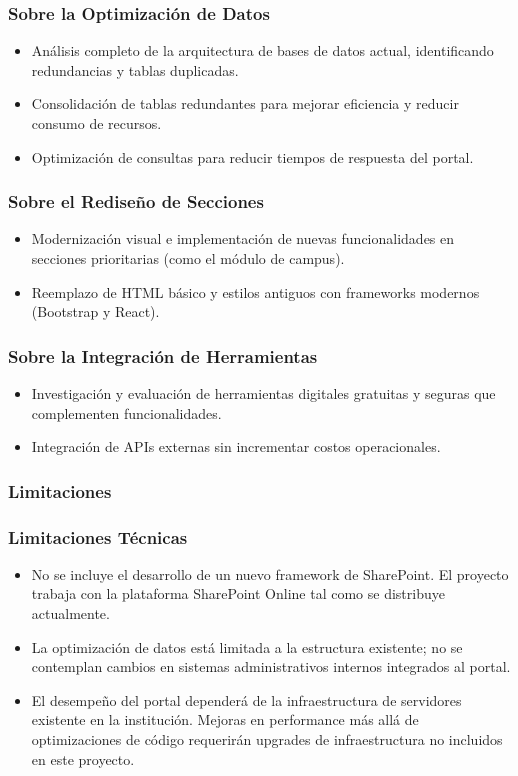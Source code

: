 \subsubsection*{Sobre la Optimización de Datos}
\begin{itemize}
    \item Análisis completo de la arquitectura de bases de datos actual, identificando redundancias y tablas duplicadas.
    \item Consolidación de tablas redundantes para mejorar eficiencia y reducir consumo de recursos.
    \item Optimización de consultas para reducir tiempos de respuesta del portal.
\end{itemize}

\subsubsection*{Sobre el Rediseño de Secciones}
\begin{itemize}
    \item Modernización visual e implementación de nuevas funcionalidades en secciones prioritarias (como el módulo de campus).
    \item Reemplazo de HTML básico y estilos antiguos con frameworks modernos (Bootstrap y React).
\end{itemize}

\subsubsection*{Sobre la Integración de Herramientas}
\begin{itemize}
    \item Investigación y evaluación de herramientas digitales gratuitas y seguras que complementen funcionalidades.
    \item Integración de APIs externas sin incrementar costos operacionales.
\end{itemize}

\subsubsection{Limitaciones}
\label{subsec:limitaciones}

\subsubsection*{Limitaciones Técnicas}
\begin{itemize}
    \item No se incluye el desarrollo de un nuevo framework de SharePoint. El proyecto trabaja con la plataforma SharePoint Online tal como se distribuye actualmente.
    \item La optimización de datos está limitada a la estructura existente; no se contemplan cambios en sistemas administrativos internos integrados al portal.
    \item El desempeño del portal dependerá de la infraestructura de servidores existente en la institución. Mejoras en performance más allá de optimizaciones de código requerirán upgrades de infraestructura no incluidos en este proyecto.
\end{itemize}

